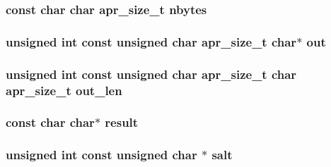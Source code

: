 \subsubsection[{\texorpdfstring{nbytes}{nbytes}}]{\setlength{\rightskip}{0pt plus 5cm}const char char {\bf apr\+\_\+size\+\_\+t} nbytes}\hypertarget{group__APR__MD5_gaf025f70c63174bcb9988a52727657287}{}\label{group__APR__MD5_gaf025f70c63174bcb9988a52727657287}
\subsubsection[{\texorpdfstring{out}{out}}]{\setlength{\rightskip}{0pt plus 5cm}unsigned {\bf int} const unsigned char {\bf apr\+\_\+size\+\_\+t} char$\ast$ out}\hypertarget{group__APR__MD5_ga06377a55be331a76054d54d308c64c79}{}\label{group__APR__MD5_ga06377a55be331a76054d54d308c64c79}
\subsubsection[{\texorpdfstring{out\+\_\+len}{out_len}}]{\setlength{\rightskip}{0pt plus 5cm}unsigned {\bf int} const unsigned char {\bf apr\+\_\+size\+\_\+t} char {\bf apr\+\_\+size\+\_\+t} out\+\_\+len}\hypertarget{group__APR__MD5_gae4951eb9317c7f920ec3c8a11388356c}{}\label{group__APR__MD5_gae4951eb9317c7f920ec3c8a11388356c}
\subsubsection[{\texorpdfstring{result}{result}}]{\setlength{\rightskip}{0pt plus 5cm}const char char$\ast$ result}\hypertarget{group__APR__MD5_ga95ec363aa31b8127125c2f4a0f6411aa}{}\label{group__APR__MD5_ga95ec363aa31b8127125c2f4a0f6411aa}
\subsubsection[{\texorpdfstring{salt}{salt}}]{\setlength{\rightskip}{0pt plus 5cm}unsigned {\bf int} const unsigned char $\ast$ salt}\hypertarget{group__APR__MD5_ga0a678842764ed169d6a8527b30273b7d}{}\label{group__APR__MD5_ga0a678842764ed169d6a8527b30273b7d}
